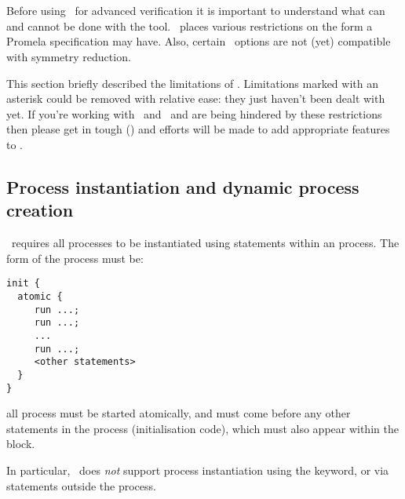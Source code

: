 \chapter{\limitations}\label{chapter:limitations}

Before using \topspin\ for advanced verification it is important to understand
what can and cannot be done with the tool.
\topspin\ places various restrictions on the form a Promela specification may have.
Also, certain \spin\ options are not (yet) compatible with symmetry reduction.

This section briefly described the limitations of \topspin.  Limitations marked
with an asterisk could be removed with relative ease: they just haven't been dealt
with yet.  If you're working with \spin\ and \topspin\ and are being hindered by
these restrictions then please get in tough () and efforts will be made
to add appropriate features to \topspin.

\section{Process instantiation and dynamic process creation}

\topspin\ requires all processes to be instantiated using
 statements within an  process.  The form of the 
process must be:

\begin{lstlisting}
init {
  atomic {
     run ...;
     run ...;
     ...
     run ...;
     <other statements>
  }
}
\end{lstlisting}

\noindent \ie all process must be started atomically, and must come before any other statements in the 
process (\eg initialisation code), which must also appear within the  block.

In particular, \topspin\ does \emph{not} support process instantiation using the  keyword,
or via  statements outside the  process.


